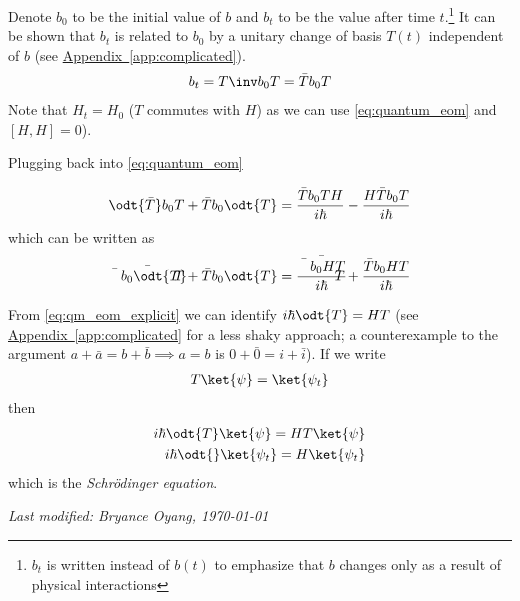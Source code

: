 \documentclass[12pt, oneside, letterpaper, fleqn]{article}
\begin{document}
Denote $b_0$ to be the initial value of $b$ and $b_t$ to be the value
after time $t$.\footnote{$b_t$ is written instead of $b(t)$ to emphasize
that $b$ changes only as a result of physical interactions} It can be
shown that $b_t$ is related to $b_0$ by a unitary change of basis $T(t)$
independent of $b$ (see
\hyperref[app:complicated]{Appendix~\ref*{app:complicated}}).
\begin{align}
b_t = T\inv b_0 T = \bar{T} b_0 T
\end{align}
Note that $H_t = H_0$ ($T$ commutes with $H$) as we can use
\eqref{eq:quantum_eom} and $[H, H] = 0$).

Plugging back into \eqref{eq:quantum_eom}

\begin{align*}
\odt{\bar{T}} b_0 T + \bar{T} b_0 \odt{T}
= \frac{\bar{T}b_0TH}{i\hbar} - \frac{H\bar{T}b_0T}{i\hbar}\\
\end{align*}
which can be written as
\begin{align}\label{eq:qm_eom_explicit}
\bar{\bar{T} b_0 \odt{T}}+ \bar{T} b_0 \odt{T}
= \bar{\frac{\bar{T}b_0HT}{i\hbar}} +
\frac{\bar{T}b_0HT}{i\hbar} 
\end{align}

From \eqref{eq:qm_eom_explicit} we can identify $i\hbar \odt{T} =
HT$ (see \hyperref[app:complicated]{Appendix~\ref*{app:complicated}}
for a less shaky approach; a counterexample to the argument $a + \bar{a}
= b + \bar{b} \implies a = b$ is $0 + \bar{0} = i + \bar{i}$). If we write
\begin{align}\label{eq:schrodinger_psi}
T\ket{\psi} = \ket{\psi_t}
\end{align}
then
\begin{align}\label{eq:schrodinger_equation}
i\hbar \odt{T} \ket{\psi} = HT\ket{\psi}\nonumber\\
i\hbar \odt{}\ket{\psi_t} = H\ket{\psi_t}
\end{align}
which is the \emph{Schr\"odinger equation}.

\hfill \emph{Last modified: Bryance Oyang, \today}
\end{document}
